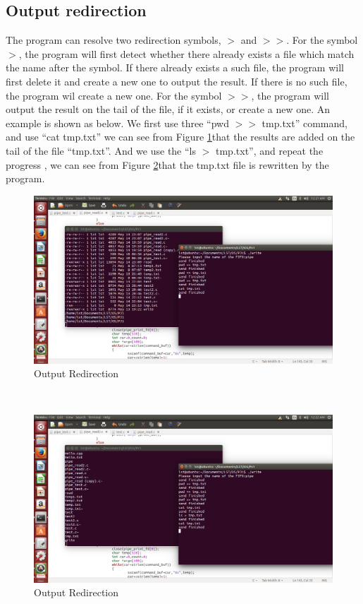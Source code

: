 \documentclass{article}
\begin{document}
\subsection{Output redirection}
The program can resolve two redirection symbols, $>$ and $>>$. For the symbol $>$, the program will first detect whether there already exists a file which match the name after the symbol. If there already exists a such file, the program will first delete it and create a new one to output the result. If there is no such file, the program wil create a new one. For the symbol $>>$, the program will output the result on the tail of the file, if it exists, or create a new one. An example is shown as below. We first use three ``pwd $>>$ tmp.txt'' command, and use ``cat tmp.txt'' we can see from Figure \ref{fig:b}that the results are added on the tail of the file ``tmp.txt''. And we use the ``ls $>$ tmp.txt'', and repeat the progress , we can see from Figure \ref{fig:c}that the tmp.txt file is rewritten by the program.
\begin{figure}[htbp]
\label{fig:b}
\includegraphics[width =400pt ,keepaspectratio ]{2.png}
\caption{Output Redirection}
\end{figure}
\\
\begin{figure}[htbp]
\label{fig:c}
\includegraphics[width =400pt ,keepaspectratio ]{3.png}
\caption{Output Redirection}
\end{figure}
\end{document}
